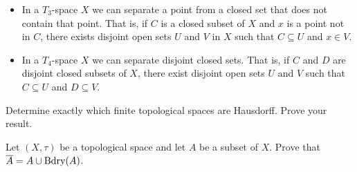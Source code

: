 \begin{itemize}
\begin{itemize}
	\item In a $T_3$-space $X$ we can separate a point from a closed set that does not contain that point. That is, if $C$ is a closed subset of $X$ and $x$ is a point not in $C$, there exists disjoint open sets $U$ and $V$ in $X$ such that $C \subseteq U$ and $x \in V$. 
	\item In a $T_4$-space $X$ we can separate disjoint closed sets. That is, if $C$ and $D$ are disjoint closed subsets of $X$, there exist disjoint open sets $U$ and $V$ such that $C \subseteq U$ and $D \subseteq V$.  
	\end{itemize}
	
\end{itemize}

\label{sec_closed_sets_top_exer}

\be

\item Determine exactly which finite topological spaces are Hausdorff. Prove your result.

\begin{comment}

\ExerciseSolution We will show that a finite topological space $(X,\tau)$ is Hausdorff if and only if $\tau$ is the discrete topology. Let $(X, \tau)$ be a finite topological space. Suppose that $X$ is Hausdorff. To prove that $\tau$ is the discrete metric, we show that every singleton set is open. Let $x \in X$. Since $X$ is Hausdorff, for every $y \in X$ there are open sets $O_x$ and $O_y$ such that $x \in O_x$, $y \in O_y$, and $O_x \cap O_y = \emptyset$.  Let $O = \bigcup_{\substack{y \ in X \\ y \neq x}} O_y$. Since there are only finite many points $y$, the set $O$ is a finite union of open sets and so $O$ is an open set. For each $y \in X \setminus \{x\}$, we know that $y  \in O_y$. Also, no $O_y$ contains $x$. So $O = X \setminus \{x\}$. Thus, $\{x\} = X \setminus O$ and so $\{x\}$ is an open set. It follows that $\tau$ is the discrete metric.

Now suppose that $\tau$ is the discrete metric. To show that $X$ is Hausdorff, let $x$, $y$ be distinct points in $X$. Then $\{x\}$ and $\{y\}$ are open and separate $x$ and $y$, so $X$ is Hausdorff. 

\end{comment}

\item Let $(X, \tau)$ be a topological space and let $A$ be a subset of $X$. Prove that $\overline{A} = A \cup \text{Bdry}(A)$. 


